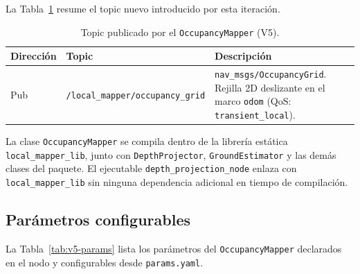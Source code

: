 La Tabla~\ref{tab:v5-topics} resume el topic nuevo introducido por esta
iteración.

\begin{table}[ht]
  \centering
  \caption{Topic publicado por el \texttt{OccupancyMapper} (V5).}
  \label{tab:v5-topics}
  \begin{tabular}{llp{6cm}}
    \hline
    \textbf{Dirección} & \textbf{Topic} & \textbf{Descripción} \\
    \hline
    Pub & \texttt{/local\_mapper/occupancy\_grid} &
      \texttt{nav\_msgs/OccupancyGrid}.
      Rejilla 2D deslizante en el marco \texttt{odom}
      (QoS: \texttt{transient\_local}). \\
    \hline
  \end{tabular}
\end{table}

La clase \texttt{OccupancyMapper} se compila dentro de la librería estática
\texttt{local\_mapper\_lib}, junto con \texttt{DepthProjector},
\texttt{GroundEstimator} y las demás clases del paquete. El ejecutable
\texttt{depth\_projection\_node} enlaza con \texttt{local\_mapper\_lib} sin
ninguna dependencia adicional en tiempo de compilación.

\subsection{Parámetros configurables}
\label{subsec:lm-v5-params}

La Tabla~\ref{tab:v5-params} lista los parámetros del
\texttt{OccupancyMapper} declarados en el nodo y configurables desde
\texttt{params.yaml}.

